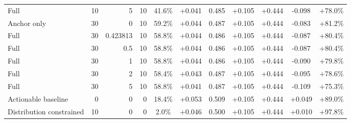 \begin{table}[htbp]
\begin{tabular}{lrrrccccccc}
Full & 10 & 5 & 10 & 41.6\% & +0.041 & 0.485 & +0.105 & +0.444 & -0.098 & +78.0\% \\
Anchor only & 30 & 0 & 10 & 59.2\% & +0.044 & 0.487 & +0.105 & +0.444 & -0.083 & +81.2\% \\
Full & 30 & 0.423813 & 10 & 58.8\% & +0.044 & 0.486 & +0.105 & +0.444 & -0.087 & +80.4\% \\
Full & 30 & 0.5 & 10 & 58.8\% & +0.044 & 0.486 & +0.105 & +0.444 & -0.087 & +80.4\% \\
Full & 30 & 1 & 10 & 58.8\% & +0.044 & 0.486 & +0.105 & +0.444 & -0.090 & +79.8\% \\
Full & 30 & 2 & 10 & 58.4\% & +0.043 & 0.487 & +0.105 & +0.444 & -0.095 & +78.6\% \\
Full & 30 & 5 & 10 & 58.8\% & +0.041 & 0.487 & +0.105 & +0.444 & -0.109 & +75.3\% \\
Actionable baseline & 0 & 0 & 0 & 18.4\% & +0.053 & 0.509 & +0.105 & +0.444 & +0.049 & +89.0\% \\
Distribution constrained & 10 & 0 & 0 & 2.0\% & +0.046 & 0.500 & +0.105 & +0.444 & +0.010 & +97.8\% \\
\bottomrule
\end{tabular}
\end{table}
